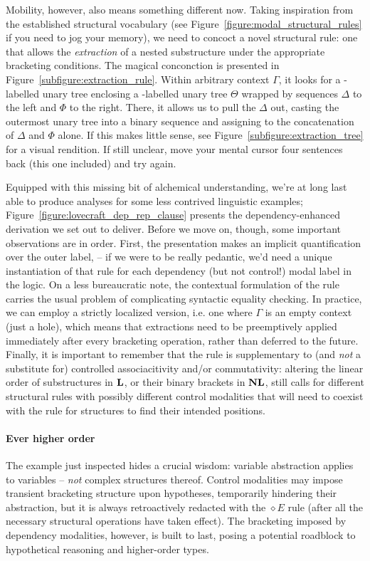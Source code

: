 Mobility, however, also means something different now.
Taking inspiration from the established structural vocabulary (see Figure~\ref{figure:modal_structural_rules} if you need to jog your memory), we need to concoct a novel structural rule: one that allows the \textit{extraction} of a nested substructure under the appropriate bracketing conditions.
The magical conconction is presented in Figure~\ref{subfigure:extraction_rule}.
Within arbitrary context $\Gamma$, it looks for a -labelled unary tree enclosing a -labelled unary tree $\Theta$ wrapped by sequences $\Delta$ to the left and $\Phi$ to the right.
There, it allows us to pull the $\Delta$ out, casting the outermost unary tree into a binary sequence and assigning  to the concatenation of $\Delta$ and $\Phi$ alone. 
If this makes little sense, see Figure~\ref{subfigure:extraction_tree} for a visual rendition.
If still unclear, move your mental cursor four sentences back (this one included) and try again.

Equipped with this missing bit of alchemical understanding, we're at long last able to produce analyses for some less contrived linguistic examples; Figure~\ref{figure:lovecraft_dep_rep_clause} presents the dependency-enhanced derivation we set out to deliver.
Before we move on, though, some important observations are in order.
First, the presentation makes an implicit quantification over the outer label,  -- if we were to be really pedantic, we'd need a unique instantiation of that rule for each dependency (but not control!) modal label in the logic.
On a less bureaucratic note, the contextual formulation of the rule carries the usual problem of complicating syntactic equality checking. 
In practice, we can employ a strictly localized version, i.e. one where $\Gamma$ is an empty context (just a hole), which means that extractions need to be preemptively applied immediately after every bracketing operation, rather than deferred to the future.
Finally, it is important to remember that the rule is supplementary to (and \textit{not} a substitute for) controlled associacitivity and/or commutativity: altering the linear order of substructures in $\textbf{L}$, or their binary brackets in $\textbf{NL}$, still calls for different structural rules with possibly different control modalities that will need to coexist with the \Extraction{} rule for structures to find their intended positions.


\paragraph{Ever higher order}
The example just inspected hides a crucial wisdom: variable abstraction applies to variables -- \textit{not} complex structures thereof.
Control modalities may impose transient bracketing structure upon hypotheses, temporarily hindering their abstraction, but it is always retroactively redacted with the $\diamond E$ rule (after all the necessary structural operations have taken effect).
The bracketing imposed by dependency modalities, however, is built to last, posing a potential roadblock to hypothetical reasoning and higher-order types.

